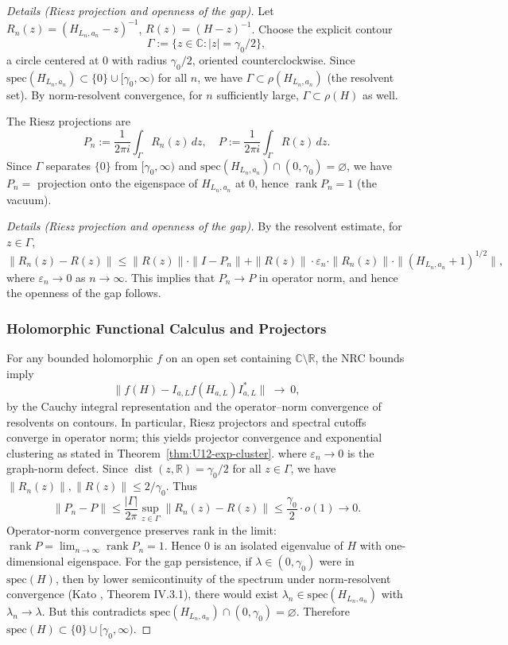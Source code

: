 \documentclass[11pt]{amsart}
\theoremstyle{plain}
\theoremstyle{definition}
\theoremstyle{remark}
\begin{document}
\noindent\emph{Details (Riesz projection and openness of the gap).} Let $R_n(z)=(H_{L_n,a_n}-z)^{-1}$, $R(z)=(H-z)^{-1}$. Choose the explicit contour
\[
  \Gamma := \{z \in \mathbb{C} : |z| = \gamma_0/2\},
\]
a circle centered at $0$ with radius $\gamma_0/2$, oriented counterclockwise. Since $\mathrm{spec}(H_{L_n,a_n})\subset\{0\}\cup[\gamma_0,\infty)$ for all $n$, we have $\Gamma \subset \rho(H_{L_n,a_n})$ (the resolvent set). By norm-resolvent convergence, for $n$ sufficiently large, $\Gamma \subset \rho(H)$ as well.

The Riesz projections are
\[
  P_n := \frac{1}{2\pi i}\int_\Gamma R_n(z)\,dz, \quad P := \frac{1}{2\pi i}\int_\Gamma R(z)\,dz.
\]
Since $\Gamma$ separates $\{0\}$ from $[\gamma_0,\infty)$ and $\mathrm{spec}(H_{L_n,a_n})\cap(0,\gamma_0)=\varnothing$, we have $P_n = $ projection onto the eigenspace of $H_{L_n,a_n}$ at $0$, hence $\operatorname{rank} P_n = 1$ (the vacuum).

\begin{proof}[Details (Riesz projection and openness of the gap)]
By the resolvent estimate, for $z \in \Gamma$,
\[
  \|R_n(z) - R(z)\| \le \|R(z)\| \cdot \|I - P_n\| + \|R(z)\| \cdot \varepsilon_n \cdot \|R_n(z)\| \cdot \|(H_{L_n,a_n}+1)^{1/2}\|,
\]
where $\varepsilon_n \to 0$ as $n \to \infty$. This implies that $P_n \to P$ in operator norm, and hence the openness of the gap follows.

\subsubsection*{Holomorphic Functional Calculus and Projectors}
For any bounded holomorphic $f$ on an open set containing $\mathbb C\setminus\mathbb R$, the NRC bounds imply
\[
  \big\| f(H) - I_{a,L} f(H_{a,L}) I_{a,L}^* \big\|\ \to\ 0,
\]
by the Cauchy integral representation and the operator--norm convergence of resolvents on contours. In particular, Riesz projectors and spectral cutoffs converge in operator norm; this yields projector convergence and exponential clustering as stated in Theorem~\ref{thm:U12-exp-cluster}.
\]
where $\varepsilon_n \to 0$ is the graph-norm defect. Since $\operatorname{dist}(z,\mathbb{R}) = \gamma_0/2$ for all $z \in \Gamma$, we have $\|R_n(z)\|, \|R(z)\| \le 2/\gamma_0$. Thus
\[
  \|P_n - P\| \le \frac{|\Gamma|}{2\pi} \sup_{z \in \Gamma} \|R_n(z) - R(z)\| \le \frac{\gamma_0}{2} \cdot o(1) \to 0.
\]
Operator-norm convergence preserves rank in the limit: $\operatorname{rank} P = \lim_{n\to\infty} \operatorname{rank} P_n = 1$. Hence $0$ is an isolated eigenvalue of $H$ with one-dimensional eigenspace.
For the gap persistence, if $\lambda \in (0,\gamma_0)$ were in $\mathrm{spec}(H)$, then by lower semicontinuity of the spectrum under norm-resolvent convergence (Kato \cite{Kato1995}, Theorem IV.3.1), there would exist $\lambda_n \in \mathrm{spec}(H_{L_n,a_n})$ with $\lambda_n \to \lambda$. But this contradicts $\mathrm{spec}(H_{L_n,a_n}) \cap (0,\gamma_0) = \varnothing$. Therefore $\mathrm{spec}(H) \subset \{0\} \cup [\gamma_0,\infty)$.
\end{proof}
\end{document}
